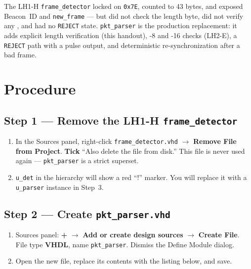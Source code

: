 \documentclass[11pt,letterpaper]{article}
\begin{document}
\begin{tcolorbox}[infobox={Relationship to the LH1-H Bring-Up Frame Detector}]
The LH1-H \texttt{frame\_detector} locked on \texttt{0x7E}, counted to 43 bytes, and exposed Beacon~ID and \texttt{new\_frame} --- but did not check the length byte, did not verify any \CRC{}, and had no \texttt{REJECT} state. \texttt{pkt\_parser} is the production replacement: it adds explicit length verification (this handout), \CRC{}-8 and \CRC{}-16 checks (LH2-E), a \texttt{REJECT} path with a pulse output, and deterministic re-synchronization after a bad frame.
\end{tcolorbox}

\section{Procedure}

\subsection{Step 1 --- Remove the LH1-H \texttt{frame\_detector}}
\begin{enumerate}[leftmargin=2em]
	\item In the Sources panel, right-click \texttt{frame\_detector.vhd} $\to$ \textbf{Remove File from Project}. \textbf{Tick} ``Also delete the file from disk.'' This file is never used again --- \texttt{pkt\_parser} is a strict superset.
	\item \texttt{u\_det} in the hierarchy will show a red ``!'' marker. You will replace it with a \texttt{u\_parser} instance in Step~3.
\end{enumerate}

\subsection{Step 2 --- Create \texttt{pkt\_parser.vhd}}
\begin{enumerate}[leftmargin=2em]
	\item Sources panel: \textbf{+} $\to$ \textbf{Add or create design sources} $\to$ \textbf{Create File}. File type \textbf{VHDL}, name \texttt{pkt\_parser}. Dismiss the Define Module dialog.
	\item Open the new file, replace its contents with the listing below, and save.
\end{enumerate}
\end{document}
